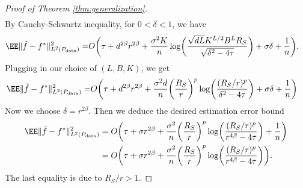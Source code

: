 \begin{proof}[Proof of Theorem \ref{thm:generalization}]
\begin{align*}
\end{align*}
By Cauchy-Schwartz inequality, for $0<\delta<1$, we have
\begin{align*}
    \EE \norm{ \hat{f} - f^*}^2_{L^2(P_{\rm data})} 
        =& O\biggl( \tau + d^{2\beta} r^{2\beta} +  \frac{\sigma^2 K}{n} \log\biggl( \frac{ \sqrt{dL} K^{L/2} B^L R_S }{\sqrt{\delta^2-4\tau}}  \biggr)+\sigma\delta+ \frac{1}{n}\biggr).
\end{align*}
Plugging in our choice of $(L,B,K)$, we get
\begin{align*}
    \EE \norm{ \hat{f} - f^*}^2_{L^2(P_{\rm data})} 
    = & O\biggl( \tau + d^{2\beta} r^{2\beta} + \frac{\sigma^2 d}{n}\biggl(\frac{R_S}{r} \biggr)^p \log\biggl( \frac{(R_S/r)^p}{ \delta^2-4\tau}\biggr)+ \sigma \delta + \frac{1}{n}\biggr)
\end{align*}
Now we choose  $\delta=r^{2\beta}$. Then we deduce the desired estimation error bound
\begin{align*}
    \EE \| \hat{f} - f^*\|^2_{L^2(P_{\rm data})} &= O\biggl(   \tau +  \sigma r^{2\beta} + \frac{\sigma^2}{n}  \biggl(\frac{R_S}{r} \biggr)^p \log\biggl( \frac{(R_S/r)^p}{ r^{4\beta}-4\tau}\biggr) + \frac{1}{n}\biggr)\\
    & = O\biggl(   \tau +  \sigma r^{2\beta} + \frac{\sigma^2}{n}  \biggl(\frac{R_S}{r} \biggr)^p \log\biggl( \frac{(R_S/r)^p}{ r^{4\beta}-4\tau}\biggr)\biggr).
\end{align*}
The last equality is due to $R_S/r>1$.

\end{proof}
